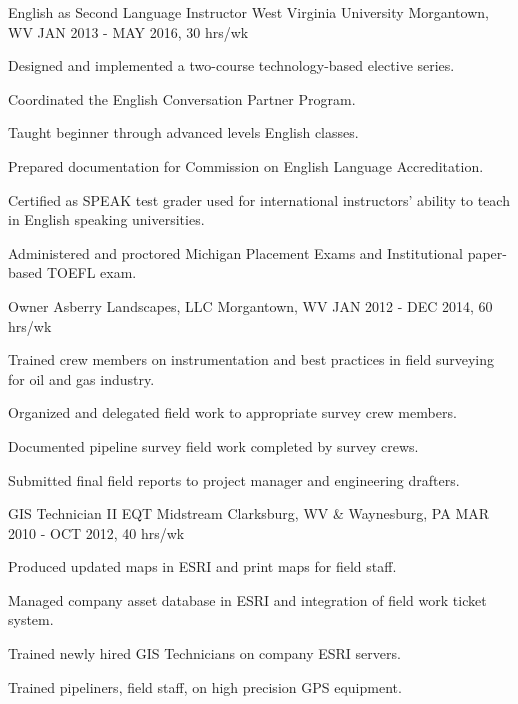 \begin{cventries}
\cventry
{English as Second Language Instructor} %
{West Virginia University} %
{Morgantown, WV} %
{JAN 2013 - MAY 2016, 30 hrs/wk} %
{ %
\begin{cvitems}
\item {Designed and implemented a two-course technology-based elective series.}
\item {Coordinated the English Conversation Partner Program.}
\item {Taught beginner through advanced levels English classes.}
\item {Prepared documentation for Commission on English Language Accreditation.}
\item {Certified as SPEAK test grader used for international instructors' ability to teach in English speaking universities.}
\item {Administered and proctored Michigan Placement Exams and Institutional paper-based TOEFL exam.}
\end{cvitems}
}


\cventry
{Owner} %
{Asberry Landscapes, LLC} %
{Morgantown, WV} %
{JAN 2012 - DEC 2014, 60 hrs/wk} %
{ %
\begin{cvitems}
\item {Trained crew members on instrumentation and best practices in field surveying for oil and gas industry.}
\item {Organized and delegated field work to appropriate survey crew members.}
\item {Documented pipeline survey field work completed by survey crews.}
\item {Submitted final field reports to project manager and engineering drafters.} 
\end{cvitems} 
}


\cventry
{GIS Technician II} %
{EQT Midstream} %
{Clarksburg, WV \& Waynesburg, PA} %
{MAR 2010 - OCT 2012, 40 hrs/wk} %
{ %
\begin{cvitems}
\item {Produced updated maps in ESRI and print maps for field staff.}
\item {Managed company asset database in ESRI and integration of field work ticket system.}
\item {Trained newly hired GIS Technicians on company ESRI servers.}
\item {Trained pipeliners, field staff, on high precision GPS equipment.}
\end{cvitems}
}


\end{cventries}
